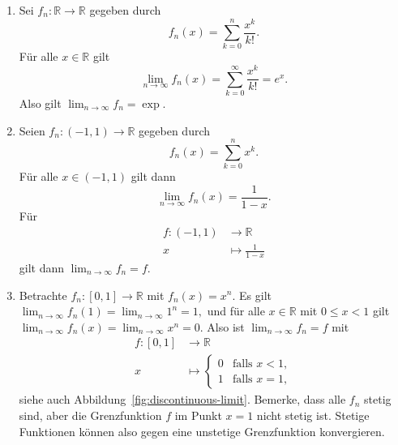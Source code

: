 \documentclass[../main.tex]{subfiles}
\begin{document}
\begin{examples}
  \leavevmode
  \begin{enumerate}[(1)]
    \item Sei $f_n \colon \mathbb{R} \to \mathbb{R}$ gegeben durch
      \[
        f_n(x) = \sum_{k=0}^{n} \frac{x^k}{k!}.
      \]
      Für alle $x \in \mathbb{R}$ gilt
      \[
        \lim_{n \to \infty} f_n(x) = \sum_{k=0}^{\infty} \frac{x^k}{k!} = e^x.
      \]
      Also gilt
      \(
        \lim_{n \to \infty} f_n = \exp.
      \)
    \item Seien $f_n \colon (-1, 1) \to \mathbb{R}$ gegeben durch
      \[
        f_n(x) = \sum_{k=0}^{n} x^k.
      \]
      Für alle $x \in (-1, 1)$ gilt dann
      \[
        \lim_{n \to \infty} f_n(x) = \frac{1}{1-x}.
      \]
      Für
      \begin{align*}
        f \colon (-1, 1) & \to \mathbb{R} \\
        x & \mapsto \frac{1}{1-x}
      \end{align*}
      gilt dann
      \(
        \lim_{n \to \infty}f_n = f.
      \)
    \item Betrachte $f_n \colon [0, 1] \to \mathbb{R}$ mit $f_n(x) = x^n$.
      Es gilt
      \(
        \lim_{n \to \infty} f_n (1) = \lim_{n \to \infty} 1^n = 1,
      \)
      und für alle $x \in \mathbb{R}$ mit $0 \leq x < 1$ gilt
      \(
        \lim_{n \to \infty} f_n(x) = \lim_{n \to \infty} x^n = 0.
      \)
      Also ist
      \(
        \lim_{n \to \infty} f_n = f
      \)
      mit
      \begin{align*}
        f \colon [0, 1] & \to \mathbb{R} \\
        x & \mapsto
        \begin{cases}
          0 & \text{falls $x < 1$},\\
          1 & \text{falls $x = 1$},
        \end{cases}
      \end{align*}
      siehe auch Abbildung~\ref{fig:discontinuous-limit}.
      Bemerke, dass alle  $f_n$ stetig sind,
      aber die Grenzfunktion $f$ im Punkt $x = 1$ 
      nicht stetig ist.
      Stetige Funktionen können also gegen eine unstetige
      Grenzfunktion konvergieren.


\end{enumerate}
\end{examples}
\end{document}
